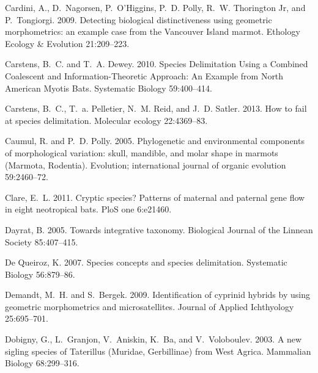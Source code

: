 \documentclass[12pt,letterpaper]{article}
\begin{document}
\begin{thebibliography}{77}
    Cardini, A., D.~Nagorsen, P.~O'Higgins, P.~D. Polly, R.~W. {Thorington Jr}, and
    P.~Tongiorgi. 2009. {Detecting biological distinctiveness using geometric
    morphometrics: an example case from the Vancouver Island marmot}. Ethology
    Ecology \& Evolution 21:209--223.

    Carstens, B.~C. and T.~A. Dewey. 2010. {Species Delimitation Using a Combined
      Coalescent and Information-Theoretic Approach: An Example from North American
    Myotis Bats}. Systematic Biology 59:400--414.

    Carstens, B.~C., T.~a. Pelletier, N.~M. Reid, and J.~D. Satler. 2013. {How to
    fail at species delimitation.} Molecular ecology 22:4369--83.

    Caumul, R. and P.~D. Polly. 2005. {Phylogenetic and environmental components of
      morphological variation: skull, mandible, and molar shape in marmots
    (Marmota, Rodentia).} Evolution; international journal of organic evolution
    59:2460--72.

    Clare, E.~L. 2011. {Cryptic species? Patterns of maternal and paternal gene
    flow in eight neotropical bats.} PloS one 6:e21460.

    Dayrat, B. 2005. {Towards integrative taxonomy}. Biological Journal of the
    Linnean Society 85:407--415.

    {De Queiroz}, K. 2007. {Species concepts and species delimitation.} Systematic
    Biology 56:879--86.

    Demandt, M.~H. and S.~Bergek. 2009. {Identification of cyprinid hybrids by
    using geometric morphometrics and microsatellites}. Journal of Applied
    Ichthyology 25:695--701.

    Dobigny, G., L.~Granjon, V.~Aniskin, K.~Ba, and V.~Voloboulev. 2003. {A new
    sigling species of Taterillus (Muridae, Gerbillinae) from West Agrica}.
    Mammalian Biology 68:299--316.


\end{thebibliography}
\end{document}
